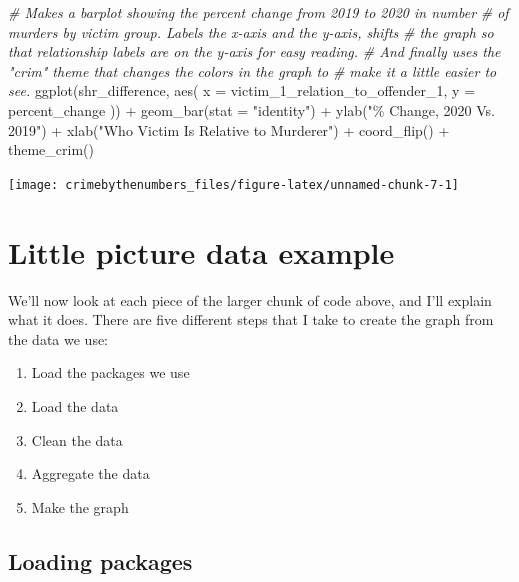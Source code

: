 \documentclass[
  a4paper,
]{krantz}
\makeatletter
\newenvironment{Shaded}{\begin{snugshade}}{\end{snugshade}}
\newcommand{\AttributeTok}[1]{\textcolor[rgb]{0.61,0.61,0.61}{#1}}
\newcommand{\CommentTok}[1]{\textcolor[rgb]{0.37,0.37,0.37}{\textit{#1}}}
\newcommand{\FunctionTok}[1]{\textcolor[rgb]{0,0,0}{#1}}
\newcommand{\NormalTok}[1]{#1}
\newcommand{\SpecialCharTok}[1]{\textcolor[rgb]{0,0,0}{#1}}
\newcommand{\StringTok}[1]{\textcolor[rgb]{0.5,0.5,0.5}{#1}}
\providecommand{\tightlist}{%
  \setlength{\itemsep}{0pt}\setlength{\parskip}{0pt}}
\newenvironment{kframe}{%
\medskip{}
\setlength{\fboxsep}{.8em}
 \def\at@end@of@kframe{}%
 \ifinner\ifhmode%
  \def\at@end@of@kframe{\end{minipage}}%
  \begin{minipage}{\columnwidth}%
 \fi\fi%
 \def\FrameCommand##1{\hskip\@totalleftmargin \hskip-\fboxsep
 \colorbox{shadecolor}{##1}\hskip-\fboxsep
     \hskip-\linewidth \hskip-\@totalleftmargin \hskip\columnwidth}%
 \MakeFramed {\advance\hsize-\width
   \@totalleftmargin\z@ \linewidth\hsize
   \@setminipage}}%
 {\par\unskip\endMakeFramed%
 \at@end@of@kframe}
\renewenvironment{Shaded}{\begin{kframe}}{\end{kframe}}
\makeatother
\begin{document}
\begin{Shaded}
\begin{Highlighting}[]
\CommentTok{\# Makes a barplot showing the percent change from 2019 to 2020 in number}
\CommentTok{\# of murders by victim group. Labels the x{-}axis and the y{-}axis, shifts}
\CommentTok{\# the graph so that relationship labels are on the y{-}axis for easy reading.}
\CommentTok{\# And finally uses the "crim" theme that changes the colors in the graph to}
\CommentTok{\# make it a little easier to see.}
\FunctionTok{ggplot}\NormalTok{(shr\_difference, }\FunctionTok{aes}\NormalTok{(}
  \AttributeTok{x =}\NormalTok{ victim\_1\_relation\_to\_offender\_1,}
  \AttributeTok{y =}\NormalTok{ percent\_change}
\NormalTok{)) }\SpecialCharTok{+}
  \FunctionTok{geom\_bar}\NormalTok{(}\AttributeTok{stat =} \StringTok{"identity"}\NormalTok{) }\SpecialCharTok{+}
  \FunctionTok{ylab}\NormalTok{(}\StringTok{"\% Change, 2020 Vs. 2019"}\NormalTok{) }\SpecialCharTok{+}
  \FunctionTok{xlab}\NormalTok{(}\StringTok{"Who Victim Is Relative to Murderer"}\NormalTok{) }\SpecialCharTok{+}
  \FunctionTok{coord\_flip}\NormalTok{() }\SpecialCharTok{+}
  \FunctionTok{theme\_crim}\NormalTok{()}
\end{Highlighting}
\end{Shaded}

\begin{center}\texttt{[image: crimebythenumbers\_files/figure-latex/unnamed-chunk-7-1]} \end{center}

\hypertarget{little-picture-data-example}{%
\section{Little picture data
example}\label{little-picture-data-example}}

We'll now look at each piece of the larger chunk of code
above, and I'll explain what it does. There are five
different steps that I take to create the graph from the
data we use:

\begin{enumerate}
\def\labelenumi{\arabic{enumi}.}
\tightlist
\item
  Load the packages we use
\item
  Load the data
\item
  Clean the data
\item
  Aggregate the data
\item
  Make the graph
\end{enumerate}

\hypertarget{loading-packages}{%
\subsection{Loading packages}\label{loading-packages}}
\end{document}
